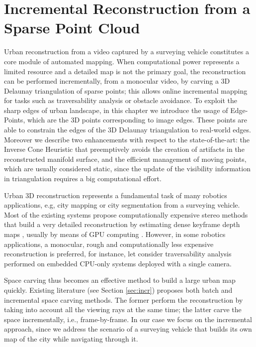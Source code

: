 \chapter{Incremental Reconstruction from a Sparse Point Cloud}
\label{ch:manif}

Urban reconstruction from a video captured by a surveying vehicle constitutes a core module of automated mapping. 
When computational power represents a limited resource and a detailed map is not the primary goal, the reconstruction can be performed incrementally, from a monocular video,
by carving a 3D Delaunay triangulation of sparse points; this allows online incremental mapping for tasks such as traversability analysis or obstacle avoidance.
To exploit the sharp edges of urban landscape, in this chapter we introduce the usage of Edge-Points, which are the 3D points corresponding to image edges.
These points are able to constrain the edges of the 3D Delaunay triangulation to real-world edges. Moreover we describe two enhancements with respect to the state-of-the-art: the Inverse Cone Heuristic that preemptively avoids the creation of artifacts in the reconstructed manifold surface, and the efficient management of moving points, which are
usually considered static, since the update of the visibility information in triangulation requires a big computational effort.

\minitoc

Urban 3D reconstruction represents a fundamental task of many robotics applications, e.g, city mapping \cite{pollefeys_et_al_08} or city segmentation \cite{Hane_et_al_09} from a surveying vehicle.
Most of the existing systems propose computationally expensive stereo methods that build a very detailed reconstruction by estimating dense keyframe depth maps , usually by means of GPU computing \cite{pollefeys_et_al_08,cornelis_et_al08}. 
However, in some robotics applications, a monocular, rough and computationally less expensive reconstruction is preferred,  for instance, let consider traversability analysis performed on embedded CPU-only systems deployed with a single camera.

Space carving \cite{seitz_et_al06} thus becomes an effective method to build  a large urban map quickly. 
Existing literature (see Section \ref{sec:incr}) proposes both batch \cite{Pan_et_al09} and incremental \cite{litvinov_lhuillier_13,lovi_et_al_11} space carving methods.
The former perform the reconstruction by taking into account all the viewing rays at the same time; the latter carve the space incrementally, i.e., frame-by-frame.
In our case we focus on the incremental approach, since we address the scenario of a surveying vehicle that builds its own map of the city while navigating through it.

